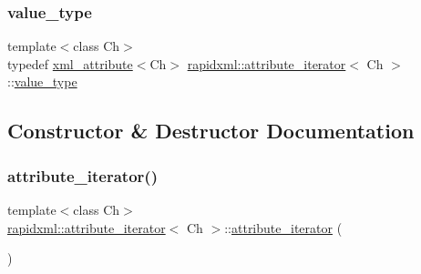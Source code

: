 \subsubsection{\texorpdfstring{value\+\_\+type}{value\_type}\hspace{0.1cm}{\footnotesize\ttfamily [2/2]}}
{\footnotesize\ttfamily template$<$class Ch$>$ \\
typedef \mbox{\hyperlink{classrapidxml_1_1xml__attribute}{xml\+\_\+attribute}}$<$Ch$>$ \mbox{\hyperlink{classrapidxml_1_1attribute__iterator}{rapidxml\+::attribute\+\_\+iterator}}$<$ Ch $>$\+::\mbox{\hyperlink{classrapidxml_1_1attribute__iterator_ad4280d358828ad9c3eb1a787decb162e}{value\+\_\+type}}}



\subsection{Constructor \& Destructor Documentation}
\mbox{\label{classrapidxml_1_1attribute__iterator_a30a82132793bc59d4e7b20f5be6237b9}} 
\subsubsection{\texorpdfstring{attribute\+\_\+iterator()}{attribute\_iterator()}\hspace{0.1cm}{\footnotesize\ttfamily [1/4]}}
{\footnotesize\ttfamily template$<$class Ch$>$ \\
\mbox{\hyperlink{classrapidxml_1_1attribute__iterator}{rapidxml\+::attribute\+\_\+iterator}}$<$ Ch $>$\+::\mbox{\hyperlink{classrapidxml_1_1attribute__iterator}{attribute\+\_\+iterator}} (\begin{DoxyParamCaption}{ }\end{DoxyParamCaption})\hspace{0.3cm}{\ttfamily [inline]}}

\mbox{\label{classrapidxml_1_1attribute__iterator_a1109344dead88533ae4dd68cea5d9613}} 
